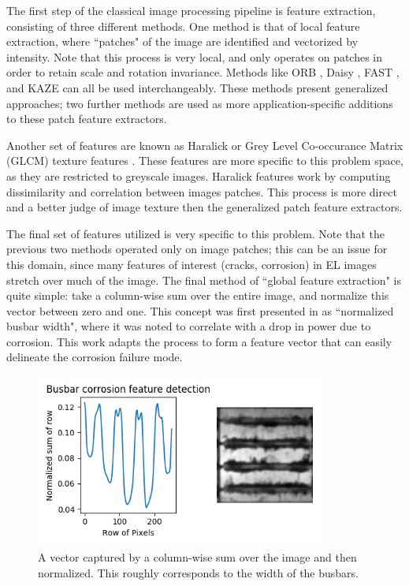 \documentclass[conference]{IEEEtran}
\begin{document}
The first step of the classical image processing pipeline is feature extraction, consisting of three different methods. 
One method is that of local feature extraction, where ``patches" of the image are identified and vectorized by intensity. 
Note that this process is very local, and only operates on patches in order to retain scale and rotation invariance. 
Methods like ORB \cite{rublee_orb_2011}, Daisy \cite{tola_daisy_2010}, FAST \cite{rosten_faster_2010}, and KAZE \cite{alcantarilla_kaze_2012} can all be used interchangeably. 
These methods present generalized approaches; two further methods are used as more application-specific additions to these patch feature extractors. 

Another set of features are known as Haralick or Grey Level Co-occurance Matrix (GLCM) texture features \cite{haralick_textural_1973}. 
These features are more specific to this problem space, as they are restricted to greyscale images. 
Haralick features work by computing dissimilarity and correlation between images patches. 
This process is more direct and a better judge of image texture then the generalized patch feature extractors. 

The final set of features utilized is very specific to this problem. 
Note that the previous two methods operated only on image patches; this can be an issue for this domain, since many features of interest (cracks, corrosion) in EL images stretch over much of the image. 
The final method of ``global feature extraction" is quite simple: take a column-wise sum over the entire image, and normalize this vector between zero and one. 
This concept was first presented in \cite{karimi_generalized_2020} as ``normalized busbar width", where it was noted to correlate with a drop in power due to corrosion. 
This work adapts the process to form a feature vector that can easily delineate the corrosion failure mode. 
\begin{figure}[h]
    \includegraphics[width=9.5cm]{global_feats.png}
    \centering
    \caption{A vector captured by a column-wise sum over the image and then normalized. This roughly corresponds to the width of the busbars.}
\label{fig:pipeline}
\end{figure}
\end{document}
